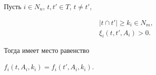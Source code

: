 \begin{lem} \label{lem4}


Пусть $i\in N_n$, $t, t'\in T$, $t\neq t'$,


\begin{gather} \label{lb9}


|t\cap t'| \geq k_i\in N_m,\\


\label{lb10}


 \xi_i(t, t', A_i)>0.


\end{gather}


Тогда имеет место равенство


$f_i(t, A_i, k_i)=f_i(t', A_i, k_i)$.


\end{lem}





